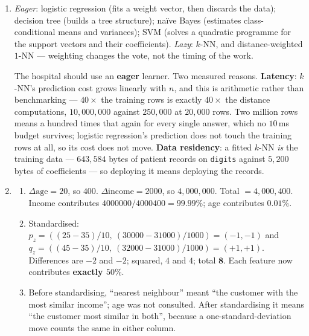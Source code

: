 \documentclass[11pt]{article}
\begin{document}
\begin{enumerate}[leftmargin=*, itemsep=0.7em]
  Class A: $0.4472 + 0.3162 + 0.2774 = \mathbf{1.0408}$.
  Class B: $1.0000 + 0.3536 = \mathbf{1.3536}$.
  Prediction: \textbf{B}.

  No, it disagrees with the uniform $5$-NN answer of A. The single very close
  B neighbour at $d = 1$ carries more weight on its own than any two of the A
  neighbours together. Verified in code:
  \texttt{KNeighborsClassifier(5, weights='distance')} returns class B.

\item \emph{Eager}: logistic regression (fits a weight vector, then discards
  the data); decision tree (builds a tree structure); na\"ive Bayes (estimates
  class-conditional means and variances); SVM (solves a quadratic programme for
  the support vectors and their coefficients). \emph{Lazy}: $k$-NN, and
  distance-weighted $1$-NN --- weighting changes the vote, not the timing of the
  work.

  The hospital should use an \textbf{eager} learner. Two measured reasons.
  \textbf{Latency}: $k$-NN's prediction cost grows linearly with $n$, and
  this is arithmetic rather than benchmarking --- $40\times$ the training rows
  is exactly $40\times$ the distance computations, $10{,}000{,}000$ against
  $250{,}000$ at $20{,}000$ rows. Two million rows means a hundred times that
  again for every single answer, which no $10$\,ms budget survives; logistic
  regression's prediction does not touch the training rows at all, so its
  cost does not move.
  \textbf{Data residency}: a fitted $k$-NN \emph{is} the training data ---
  $643{,}584$ bytes of patient records on \texttt{digits} against $5{,}200$
  bytes of coefficients --- so deploying it means deploying the records.

\item
  \begin{enumerate}[label=(\alph*)]
    \item $\Delta\text{age} = 20$, so $400$. $\Delta\text{income} = 2000$, so
      $4{,}000{,}000$. Total $= 4{,}000{,}400$. Income contributes
      $4000000/4000400 = \mathbf{99.99\%}$; age contributes
      $\mathbf{0.01\%}$.
    \item Standardised: $p_z = ((25-35)/10,\ (30000-31000)/1000) = (-1, -1)$
      and $q_z = ((45-35)/10,\ (32000-31000)/1000) = (+1, +1)$. Differences
      are $-2$ and $-2$; squared, $4$ and $4$; total $\mathbf{8}$. Each
      feature now contributes \textbf{exactly $50\%$}.
    \item Before standardising, ``nearest neighbour'' meant ``the customer with
      the most similar income''; age was not consulted. After standardising it
      means ``the customer most similar in both'', because a one-standard-deviation
      move counts the same in either column.
  \end{enumerate}


\end{enumerate}
\end{document}
